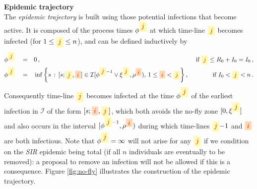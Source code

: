 \documentclass[]{article}
\newcommand{\Infections}{\mathcal{I}}
\newcommand{\SIR}{\emph{SIR}\xspace}
\newcommand{\infectee}{{\colorbox{yellow!30}{$\textcolor{red}{j}$}}}
\newcommand{\infector}{{\colorbox{orange!30}{$\textcolor{red}{i}$}}}
\begin{document}
 \medskip
 \noindent \textbf{Epidemic trajectory}\\
 The \emph{epidemic trajectory} is built using those potential infections that become active.%
 It is composed of the process times \(\phi^\infectee\) at which time-line \(\infectee\) becomes
 infected (for \(1\leq \infectee\leq n\)), and can be defined inductively by
 \begin{align}\label{eq:epidemic}
  \phi^\infectee \quad=&\quad 0\,, 
  &\text{ if \(\infectee\leq R_0+I_0=I_0\)}\,,
  \nonumber\\ 
  \phi^\infectee \quad=&\quad
  \inf\left\{s\,:\,[s;\infectee,\infector]\in
		\Infections[\phi^{\infectee{-}1}\vee \xi^\infectee,\rho^\infector),\,1\le \infector<\infectee\right\} ,
& \text{ if } I_0 < \infectee < n \,.
 \end{align}
Consequently time-line \(\infectee\) becomes infected at the time \(\phi^\infectee\)
of the earliest infection in \(\Infections\) of the form \([s;\infector,\infectee]\),
which both avoids the no-fly zone \([0,\xi^\infectee]\) and also occurs in the interval \([\phi^{\infectee{-}1},\rho^\infector)\) 
during which time-lines \(\infectee{-}1\) and \(\infector\) are both infectious.
Note that \(\phi^\infectee=\infty\) will not arise for any \(\infectee\) 
if we condition on the \SIR epidemic being total (if all \(n\) individuals are eventually to be removed):
a proposal to remove an infection will not be allowed if this is a consequence.%
\text{ }%
Figure \ref{fig:no-fly} illustrates the construction
of the epidemic trajectory.
\end{document}
